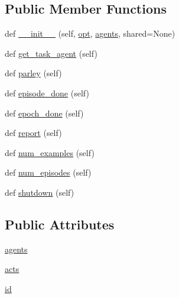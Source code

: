 \subsection*{Public Member Functions}
\begin{DoxyCompactItemize}
\item 
def \hyperlink{classparlai_1_1core_1_1worlds_1_1DialogPartnerWorld_a21ea86d832ae73e670fcfbaea943e1c0}{\+\_\+\+\_\+init\+\_\+\+\_\+} (self, \hyperlink{classparlai_1_1core_1_1worlds_1_1World_a3640d92718acd3e6942a28c1ab3678bd}{opt}, \hyperlink{classparlai_1_1core_1_1worlds_1_1DialogPartnerWorld_a04185d1d55ca86c96c796f12f2226fc9}{agents}, shared=None)
\item 
def \hyperlink{classparlai_1_1core_1_1worlds_1_1DialogPartnerWorld_ac3a0c82c725967468208ec10022b6abe}{get\+\_\+task\+\_\+agent} (self)
\item 
def \hyperlink{classparlai_1_1core_1_1worlds_1_1DialogPartnerWorld_a3ae10cae524d87d709e55bc7b2fd8265}{parley} (self)
\item 
def \hyperlink{classparlai_1_1core_1_1worlds_1_1DialogPartnerWorld_a2d18d6d327510401b39e4549540e4ada}{episode\+\_\+done} (self)
\item 
def \hyperlink{classparlai_1_1core_1_1worlds_1_1DialogPartnerWorld_a4cb1a886df2adc8e469d45652264da36}{epoch\+\_\+done} (self)
\item 
def \hyperlink{classparlai_1_1core_1_1worlds_1_1DialogPartnerWorld_a7cf7d09efbe302c30e885641a0189ae8}{report} (self)
\item 
def \hyperlink{classparlai_1_1core_1_1worlds_1_1DialogPartnerWorld_aa925a37ec5968d137faf044279943e6a}{num\+\_\+examples} (self)
\item 
def \hyperlink{classparlai_1_1core_1_1worlds_1_1DialogPartnerWorld_ab34285faaee3830fbf1d9d53869ec47c}{num\+\_\+episodes} (self)
\item 
def \hyperlink{classparlai_1_1core_1_1worlds_1_1DialogPartnerWorld_a281de2cc19b4f7c07ddd51d7c213f3ea}{shutdown} (self)
\end{DoxyCompactItemize}
\subsection*{Public Attributes}
\begin{DoxyCompactItemize}
\item 
\hyperlink{classparlai_1_1core_1_1worlds_1_1DialogPartnerWorld_a04185d1d55ca86c96c796f12f2226fc9}{agents}
\item 
\hyperlink{classparlai_1_1core_1_1worlds_1_1DialogPartnerWorld_ab20044fc960066ca7e04bc4cf580a2be}{acts}
\item 
\hyperlink{classparlai_1_1core_1_1worlds_1_1DialogPartnerWorld_a7b3dc60816b628d1e358521b23d50e2c}{id}
\end{DoxyCompactItemize}
